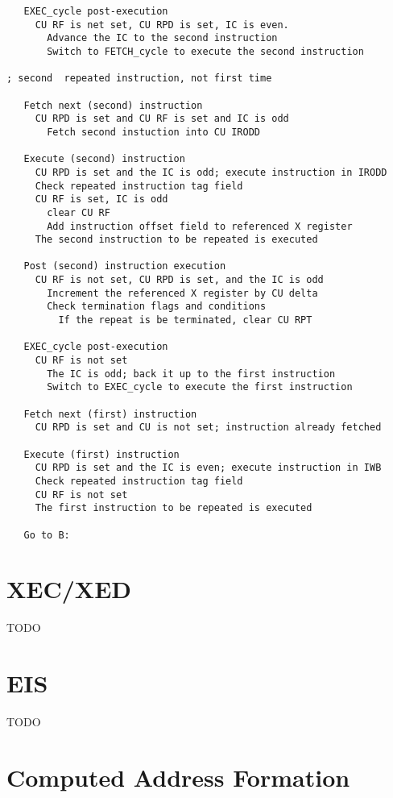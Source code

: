 \documentclass[notitlepage]{report}
\begin{document}
\begin{verbatim}
   EXEC_cycle post-execution
     CU RF is net set, CU RPD is set, IC is even.
       Advance the IC to the second instruction
       Switch to FETCH_cycle to execute the second instruction
      
; second  repeated instruction, not first time

   Fetch next (second) instruction
     CU RPD is set and CU RF is set and IC is odd
       Fetch second instuction into CU IRODD

   Execute (second) instruction
     CU RPD is set and the IC is odd; execute instruction in IRODD
     Check repeated instruction tag field
     CU RF is set, IC is odd
       clear CU RF
       Add instruction offset field to referenced X register
     The second instruction to be repeated is executed

   Post (second) instruction execution
     CU RF is not set, CU RPD is set, and the IC is odd
       Increment the referenced X register by CU delta
       Check termination flags and conditions
         If the repeat is be terminated, clear CU RPT

   EXEC_cycle post-execution
     CU RF is not set
       The IC is odd; back it up to the first instruction
       Switch to EXEC_cycle to execute the first instruction

   Fetch next (first) instruction
     CU RPD is set and CU is not set; instruction already fetched

   Execute (first) instruction
     CU RPD is set and the IC is even; execute instruction in IWB
     Check repeated instruction tag field
     CU RF is not set
     The first instruction to be repeated is executed

   Go to B:
\end{verbatim}


\section{XEC/XED}

TODO

\section{EIS}

TODO

\section{Computed Address Formation}
\end{document}
